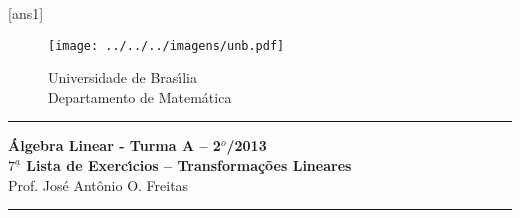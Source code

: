 \documentclass[12pt]{exam}
\newcommand{\vesp}[1]{\vspace{ #1  cm}}
\begin{document}
\pagestyle{empty}

[ans1]

\begin{figure}[h]
        \begin{minipage}[c]{1.7cm}
        \texttt{[image: ../../../imagens/unb.pdf]}
        \end{minipage}%
        \hspace{0pt}
        \begin{minipage}[c]{4in}
          {Universidade de Bras{\'\i}lia} \\
          {Departamento de Matem{\'a}tica}
\end{minipage}
\end{figure}

\vesp{-0.35} \hrule

\begin{center}
{\Large\bf \'Algebra Linear - Turma A -- 2$^{o}$/2013} \\ \vspace{9pt} {\large\bf
  $7^{\underline{a}}$ Lista de Exerc{\'\i}cios -- Transforma\c{c}\~oes Lineares}\\ \vspace{9pt} Prof. Jos{\'e} Ant{\^o}nio O. Freitas
\end{center}
\hrule

\vesp{.6}
\end{document}
